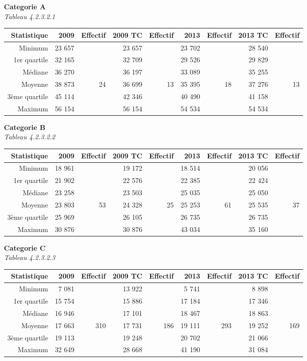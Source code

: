 \textbf{Categorie A}\\
\hspace*{0.333em}\emph{Tableau 4.2.3.2.1}

\begin{longtable}[]{@{}rrrrrrrrr@{}}
\toprule
Statistique & 2009 & Effectif & 2009 TC & Effectif & 2013 & Effectif &
2013 TC & Effectif\tabularnewline
\midrule
\endhead
Minimum & 23 657 & & 23 657 & & 23 702 & & 28 540 &\tabularnewline
1er quartile & 32 165 & & 32 709 & & 29 526 & & 29 829 &\tabularnewline
Médiane & 36 270 & & 36 197 & & 33 089 & & 35 255 &\tabularnewline
Moyenne & 38 873 & 24 & 36 699 & 13 & 35 395 & 18 & 37 276 &
13\tabularnewline
3ème quartile & 45 114 & & 42 346 & & 40 490 & & 41 158 &\tabularnewline
Maximum & 56 154 & & 56 154 & & 54 534 & & 54 534 &\tabularnewline
\bottomrule
\end{longtable}

\textbf{Categorie B}\\
\hspace*{0.333em}\emph{Tableau 4.2.3.2.2}

\begin{longtable}[]{@{}rrrrrrrrr@{}}
\toprule
Statistique & 2009 & Effectif & 2009 TC & Effectif & 2013 & Effectif &
2013 TC & Effectif\tabularnewline
\midrule
\endhead
Minimum & 18 961 & & 19 172 & & 18 514 & & 20 056 &\tabularnewline
1er quartile & 21 902 & & 22 576 & & 22 385 & & 22 424 &\tabularnewline
Médiane & 23 258 & & 23 503 & & 25 035 & & 25 050 &\tabularnewline
Moyenne & 23 803 & 53 & 24 328 & 25 & 25 253 & 61 & 25 535 &
37\tabularnewline
3ème quartile & 25 969 & & 26 105 & & 26 735 & & 26 735 &\tabularnewline
Maximum & 30 876 & & 30 876 & & 43 034 & & 35 160 &\tabularnewline
\bottomrule
\end{longtable}

\textbf{Categorie C}\\
\hspace*{0.333em}\emph{Tableau 4.2.3.2.3}

\begin{longtable}[]{@{}rrrrrrrrr@{}}
\toprule
Statistique & 2009 & Effectif & 2009 TC & Effectif & 2013 & Effectif &
2013 TC & Effectif\tabularnewline
\midrule
\endhead
Minimum & 7 081 & & 13 922 & & 5 741 & & 8 898 &\tabularnewline
1er quartile & 15 754 & & 15 886 & & 17 184 & & 17 346 &\tabularnewline
Médiane & 16 946 & & 17 101 & & 18 467 & & 18 863 &\tabularnewline
Moyenne & 17 663 & 310 & 17 731 & 186 & 19 111 & 293 & 19 252 &
169\tabularnewline
3ème quartile & 19 113 & & 19 248 & & 20 702 & & 21 066 &\tabularnewline
Maximum & 32 649 & & 28 668 & & 41 190 & & 31 084 &\tabularnewline
\bottomrule
\end{longtable}

